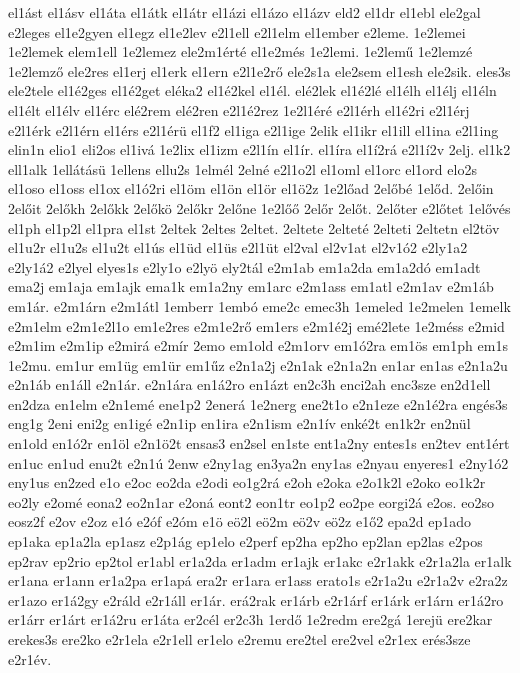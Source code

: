 {el1ást
el1ásv
el1áta
el1átk
el1átr
el1ázi
el1ázo
el1ázv
eld2
el1dr
el1ebl
ele2gal
e2leges
el1e2gyen
el1egz
el1e2lev
e2l1ell
e2l1elm
el1ember
e2leme.
1e2lemei
1e2lemek
elem1ell
1e2lemez
ele2m1érté
el1e2més
1e2lemi.
1e2lemű
1e2lemzé
1e2lemző
ele2res
el1erj
el1erk
el1ern
e2l1e2rő
ele2s1a
ele2sem
el1esh
ele2sik.
eles3s
ele2tele
el1é2ges
el1é2get
eléka2
el1é2kel
el1él.
elé2lek
el1é2lé
el1élh
el1élj
el1éln
el1élt
el1élv
el1érc
elé2rem
elé2ren
e2l1é2rez
1e2l1éré
e2l1érh
el1é2ri
e2l1érj
e2l1érk
e2l1érn
el1érs
e2l1érü
el1f2
el1iga
e2l1ige
2elik
el1ikr
el1ill
el1ina
e2l1ing
elin1n
elio1
eli2os
el1ivá
1e2lix
el1izm
e2l1ín
el1ír.
el1íra
el1í2rá
e2l1í2v
2elj.
el1k2
ell1alk
1ellátásü
1ellens
ellu2s
1elmél
2elné
e2l1o2l
el1oml
el1orc
el1ord
elo2s
el1oso
el1oss
el1ox
el1ó2ri
el1öm
el1ön
el1ör
el1ö2z
1e2lőad
2előbé
1előd.
2előin
2előit
2előkh
2előkk
2előkö
2előkr
2előne
1e2lőő
2előr
2előt.
2előter
e2lőtet
1elővés
el1ph
el1p2l
el1pra
el1st
2eltek
2eltes
2eltet.
2eltete
2elteté
2elteti
2eltetn
el2töv
el1u2r
el1u2s
el1u2t
el1ús
el1üd
el1üs
e2l1üt
el2val
el2v1at
el2v1ó2
e2ly1a2
e2ly1á2
e2lyel
elyes1s
e2ly1o
e2lyö
ely2tál
e2m1ab
em1a2da
em1a2dó
em1adt
ema2j
em1aja
em1ajk
ema1k
em1a2ny
em1arc
e2m1ass
em1atl
e2m1av
e2m1áb
em1ár.
e2m1árn
e2m1átl
1emberr
1embó
eme2c
emec3h
1emeled
1e2melen
1emelk
e2m1elm
e2m1e2l1o
em1e2res
e2m1e2rő
em1ers
e2m1é2j
emé2lete
1e2méss
e2mid
e2m1im
e2m1ip
e2mirá
e2mír
2emo
em1old
e2m1orv
em1ó2ra
em1ös
em1ph
em1s
1e2mu.
em1ur
em1üg
em1ür
em1űz
e2n1a2j
e2n1ak
e2n1a2n
en1ar
en1as
e2n1a2u
e2n1áb
en1áll
e2n1ár.
e2n1ára
en1á2ro
en1ázt
en2c3h
enci2ah
enc3sze
en2d1ell
en2dza
en1elm
e2n1emé
ene1p2
2enerá
1e2nerg
ene2t1o
e2n1eze
e2n1é2ra
engés3s
eng1g
2eni
eni2g
en1igé
e2n1ip
en1ira
e2n1ism
e2n1ív
enké2t
en1k2r
en2nül
en1old
en1ó2r
en1öl
e2n1ö2t
ensas3
en2sel
en1ste
ent1a2ny
entes1s
en2tev
ent1ért
en1uc
en1ud
enu2t
e2n1ú
2enw
e2ny1ag
en3ya2n
eny1as
e2nyau
enyeres1
e2ny1ó2
eny1us
en2zed
e1o
e2oc
eo2da
e2odi
eo1g2rá
e2oh
e2oka
e2o1k2l
e2oko
eo1k2r
eo2ly
e2omé
eona2
eo2n1ar
e2oná
eont2
eon1tr
eo1p2
eo2pe
eorgi2á
e2os.
eo2so
eosz2f
e2ov
e2oz
e1ó
e2óf
e2óm
e1ö
eö2l
eö2m
eö2v
eö2z
e1ő2
epa2d
ep1ado
ep1aka
ep1a2la
ep1asz
e2p1ág
ep1elo
e2perf
ep2ha
ep2ho
ep2lan
ep2las
e2pos
ep2rav
ep2rio
ep2tol
er1abl
er1a2da
er1adm
er1ajk
er1akc
e2r1akk
e2r1a2la
er1alk
er1ana
er1ann
er1a2pa
er1apá
era2r
er1ara
er1ass
erato1s
e2r1a2u
e2r1a2v
e2ra2z
er1azo
er1á2gy
e2ráld
e2r1áll
er1ár.
erá2rak
er1árb
e2r1árf
er1árk
er1árn
er1á2ro
er1árr
er1árt
er1á2ru
er1áta
er2cél
er2c3h
1erdő
1e2redm
ere2gá
1erejü
ere2kar
erekes3s
ere2ko
e2r1ela
e2r1ell
er1elo
e2remu
ere2tel
ere2vel
e2r1ex
erés3sze
e2r1év.
}
